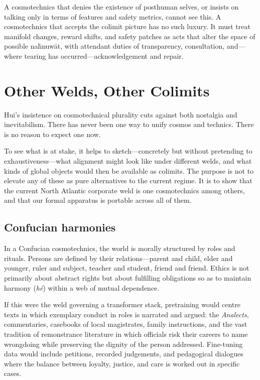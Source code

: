 \documentclass[12pt,a4paper]{article}
\begin{document}
A cosmotechnics that denies the existence of posthuman selves, or insists on talking only in terms of features and safety metrics, cannot see this. A cosmotechnics that accepts the colimit picture has no such luxury. It must treat manifold changes, reward shifts, and safety patches as acts that alter the space of possible na\={h}nuw\={a}t, with attendant duties of transparency, consultation, and---where tearing has occurred---acknowledgement and repair.

\section{Other Welds, Other Colimits}

Hui's insistence on cosmotechnical plurality cuts against both nostalgia and inevitabilism. There has never been one way to unify cosmos and technics. There is no reason to expect one now.

To see what is at stake, it helps to sketch---concretely but without pretending to exhaustiveness---what alignment might look like under different welds, and what kinds of global objects would then be available as colimits. The purpose is not to elevate any of these as pure alternatives to the current regime. It is to show that the current North Atlantic corporate weld is one cosmotechnics among others, and that our formal apparatus is portable across all of them.

\subsection{Confucian harmonies}

In a Confucian cosmotechnics, the world is morally structured by roles and rituals. Persons are defined by their relations---parent and child, elder and younger, ruler and subject, teacher and student, friend and friend. Ethics is not primarily about abstract rights but about fulfilling obligations so as to maintain harmony (\emph{h\'e}) within a web of mutual dependence.

If this were the weld governing a transformer stack, pretraining would centre texts in which exemplary conduct in roles is narrated and argued: the \emph{Analects}, commentaries, casebooks of local magistrates, family instructions, and the vast tradition of remonstrance literature in which officials risk their careers to name wrongdoing while preserving the dignity of the person addressed. Fine-tuning data would include petitions, recorded judgements, and pedagogical dialogues where the balance between loyalty, justice, and care is worked out in specific cases.
\end{document}
